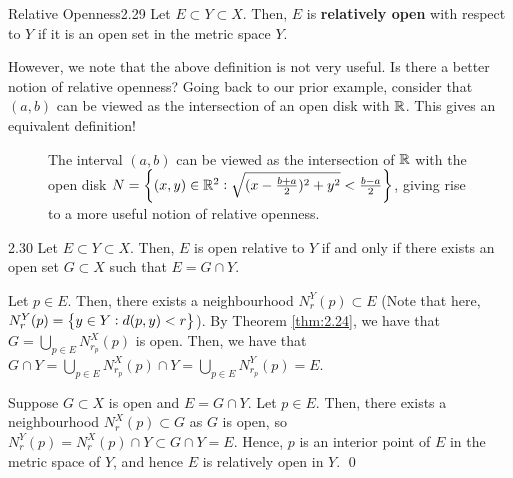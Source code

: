 \setcounter{rudin}{28}
\begin{definition}{Relative Openness}{2.29}
    Let $E \subset Y \subset X$. Then, $E$ is \textbf{relatively open} with respect to $Y$ if it is an open set in the metric space $Y$.
\end{definition}
\noindent However, we note that the above definition is not very useful. Is there a better notion of relative openness? Going back to our prior example, consider that $(a, b)$ can be viewed as the intersection of an open disk with $\mathbb{R}$. This gives an equivalent definition!
\begin{figure}[htbp]
    \centering
    \caption{The interval $(a, b)$ can be viewed as the intersection of $\mathbb{R}$ with the open disk $N = \set{(x, y) \in \mathbb{R}^2: \sqrt{(x - \frac{b+a}{2})^2 + y^2} < \frac{b-a}{2}}$, giving rise to a more useful notion of relative openness.}
    \label{fig10}
\end{figure}
\begin{theorem}{}{2.30}
    Let $E \subset Y \subset X$. Then, $E$ is open relative to $Y$ if and only if there exists an open set $G \subset X$ such that $E = G \cap Y$. 
\end{theorem}
\begin{nproof}
    \boxed{\implies} Let $p \in E$. Then, there exists a neighbourhood $N_r^Y(p) \subset E$ (Note that here, $N_r^Y(p) = \set{y \in Y: d(p, y) < r}$). By Theorem \ref{thm:2.24}, we have that $G = \bigcup_{p \in E} N_{r_{p}}^X(p)$ is open. Then, we have that $G \cap Y = \bigcup_{p \in E} N_{r_p}^X(p) \cap Y = \bigcup_{p \in E} N_{r_p}^Y(p) = E$.
    
    \boxed{\impliedby} Suppose $G \subset X$ is open and $E = G \cap Y$. Let $p \in E$. Then, there exists a neighbourhood $N_r^X(p) \subset G$ as $G$ is open, so $N_r^Y(p) = N_r^X(p) \cap Y \subset G \cap Y = E$. Hence, $p$ is an interior point of $E$ in the metric space of $Y$, and hence $E$ is relatively open in $Y$. \qed
\end{nproof}

